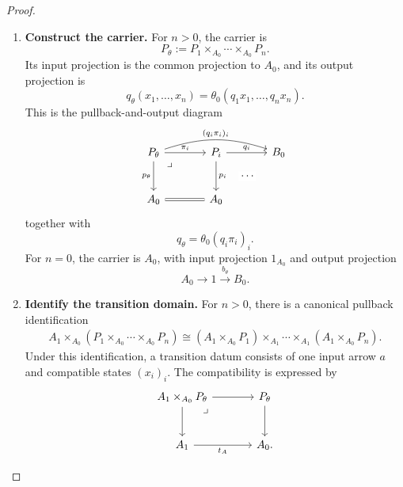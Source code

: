 \begin{proof}
    \leavevmode
    \begin{enumerate}
        \item \textbf{Construct the carrier.}
        For \(n>0\), the carrier is
        \[
            P_\theta:=P_1\times_{A_0}\cdots\times_{A_0}P_n.
        \]
        Its input projection is the common projection to \(A_0\), and its
        output projection is
        \[
            q_\theta(x_1,\dots,x_n)
            =
            \theta_0(q_1x_1,\dots,q_nx_n).
        \]
        This is the pullback-and-output diagram
        \[
        \begin{tikzcd}[column sep=large, row sep=large]
            P_\theta
                \arrow[r, "\pi_i"]
                \arrow[d, "p_\theta"']
                \arrow[dr, phantom, "\lrcorner", very near start]
                \arrow[rr, bend left=18, "{(q_i\pi_i)_i}"]
            &
            P_i
                \arrow[d, "p_i"]
                \arrow[r, "q_i"]
            &
            B_0
            \\
            A_0
                \arrow[r, equal]
            &
            A_0
                \arrow[ur, phantom, "\cdots" description]
            &
        \end{tikzcd}
        \]
        together with
        \[
            q_\theta=\theta_0(q_i\pi_i)_i.
        \]
        For \(n=0\), the carrier is \(A_0\), with input projection
        \(1_{A_0}\) and output projection
        \[
            A_0\to 1\xrightarrow{b_\theta}B_0.
        \]

        \item \textbf{Identify the transition domain.}
        For \(n>0\), there is a canonical pullback identification
        \[
        \begin{aligned}
            A_1\times_{A_0}
            \left(P_1\times_{A_0}\cdots\times_{A_0}P_n\right)
            \cong
            \left(A_1\times_{A_0}P_1\right)
            \times_{A_1}
            \cdots
            \times_{A_1}
            \left(A_1\times_{A_0}P_n\right).
        \end{aligned}
        \]
        Under this identification, a transition datum consists of one input
        arrow \(a\) and compatible states \((x_i)_i\). The compatibility is
        expressed by
        \[
        \begin{tikzcd}[column sep=large, row sep=large]
            A_1\times_{A_0}P_\theta
                \arrow[r]
                \arrow[d]
                \arrow[dr, phantom, "\lrcorner", very near start]
            &
            P_\theta
                \arrow[d]
            \\
            A_1
                \arrow[r, "t_A"']
            &
            A_0 .
        \end{tikzcd}
        \]


\end{enumerate}
\end{proof}
